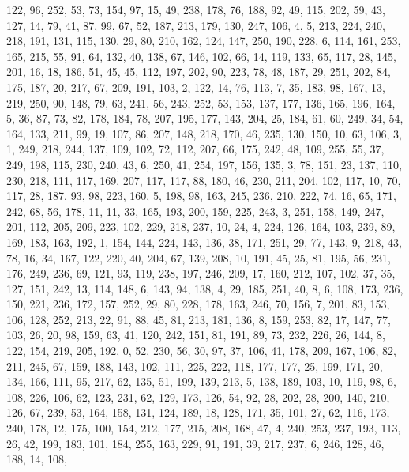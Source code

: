 \begin{DoxyCode}
       122, 96, 252, 53, 73, 154, 97, 15, 49, 238, 178, 76, 188, 92, 49, 115, 202, 59, 43, 127, 14, 79, 41, 87, 99,
       67, 52, 187, 213, 179, 130, 247, 106, 4, 5, 213, 224, 240, 218, 191, 131, 115, 130, 29, 80, 210, 162, 124,
       147, 250, 190, 228, 6, 114, 161, 253, 165, 215, 55, 91, 64, 132, 40, 138, 67, 146, 102, 66, 14, 119, 133,
       65, 117, 28, 145, 201, 16, 18, 186, 51, 45, 45, 112, 197, 202, 90, 223, 78, 48, 187, 29, 251, 202, 84, 175,
       187, 20, 217, 67, 209, 191, 103, 2, 122, 14, 76, 113, 7, 35, 183, 98, 167, 13, 219, 250, 90, 148, 79, 63, 241,
       56, 243, 252, 53, 153, 137, 177, 136, 165, 196, 164, 5, 36, 87, 73, 82, 178, 184, 78, 207, 195, 177, 143,
       204, 25, 184, 61, 60, 249, 34, 54, 164, 133, 211, 99, 19, 107, 86, 207, 148, 218, 170, 46, 235, 130, 150, 10,
       63, 106, 3, 1, 249, 218, 244, 137, 109, 102, 72, 112, 207, 66, 175, 242, 48, 109, 255, 55, 37, 249, 198,
       115, 230, 240, 43, 6, 250, 41, 254, 197, 156, 135, 3, 78, 151, 23, 137, 110, 230, 218, 111, 117, 169, 207,
       117, 117, 88, 180, 46, 230, 211, 204, 102, 117, 10, 70, 117, 28, 187, 93, 98, 223, 160, 5, 198, 98, 163, 245,
       236, 210, 222, 74, 16, 65, 171, 242, 68, 56, 178, 11, 11, 33, 165, 193, 200, 159, 225, 243, 3, 251, 158, 149,
       247, 201, 112, 205, 209, 223, 102, 229, 218, 237, 10, 24, 4, 224, 126, 164, 103, 239, 89, 169, 183, 163,
       192, 1, 154, 144, 224, 143, 136, 38, 171, 251, 29, 77, 143, 9, 218, 43, 78, 16, 34, 167, 122, 220, 40, 204,
       67, 139, 208, 10, 191, 45, 25, 81, 195, 56, 231, 176, 249, 236, 69, 121, 93, 119, 238, 197, 246, 209, 17, 160,
       212, 107, 102, 37, 35, 127, 151, 242, 13, 114, 148, 6, 143, 94, 138, 4, 29, 185, 251, 40, 8, 6, 108, 173,
       236, 150, 221, 236, 172, 157, 252, 29, 80, 228, 178, 163, 246, 70, 156, 7, 201, 83, 153, 106, 128, 252, 213,
       22, 91, 88, 45, 81, 213, 181, 136, 8, 159, 253, 82, 17, 147, 77, 103, 26, 20, 98, 159, 63, 41, 120, 242,
       151, 81, 191, 89, 73, 232, 226, 26, 144, 8, 122, 154, 219, 205, 192, 0, 52, 230, 56, 30, 97, 37, 106, 41, 178,
       209, 167, 106, 82, 211, 245, 67, 159, 188, 143, 102, 111, 225, 222, 118, 177, 177, 25, 199, 171, 20, 134,
       166, 111, 95, 217, 62, 135, 51, 199, 139, 213, 5, 138, 189, 103, 10, 119, 98, 6, 108, 226, 106, 62, 123, 231,
       62, 129, 173, 126, 54, 92, 28, 202, 28, 200, 140, 210, 126, 67, 239, 53, 164, 158, 131, 124, 189, 18, 128,
       171, 35, 101, 27, 62, 116, 173, 240, 178, 12, 175, 100, 154, 212, 177, 215, 208, 168, 47, 4, 240, 253, 237,
       193, 113, 26, 42, 199, 183, 101, 184, 255, 163, 229, 91, 191, 39, 217, 237, 6, 246, 128, 46, 188, 14, 108,

\end{DoxyCode}
